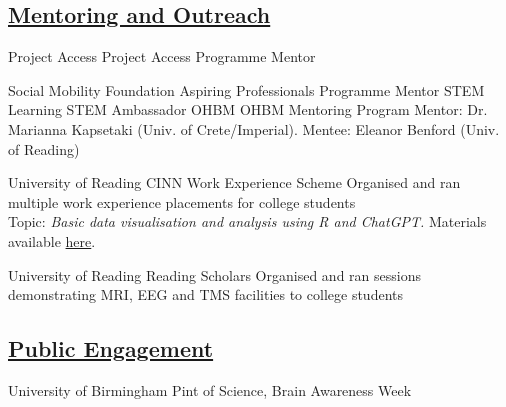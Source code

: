 
\subsection{\underline{Mentoring and Outreach}}

{Project Access}
{Project Access Programme Mentor}

{Social Mobility Foundation}
{Aspiring Professionals Programme Mentor}
{}
{STEM Learning}
{STEM Ambassador}
{}
{OHBM}
{OHBM Mentoring Program}
{Mentor: Dr. Marianna Kapsetaki (Univ. of Crete/Imperial). Mentee: Eleanor Benford (Univ. of Reading)}

{University of Reading}
{CINN Work Experience Scheme}
{Organised and ran multiple work experience placements for college students \\Topic: \emph{Basic data visualisation and analysis using R and ChatGPT.} Materials available \href{https://github.com/sohaamir/haven_work_exp}{here}.}

{University of Reading}
{Reading Scholars}
{Organised and ran sessions demonstrating MRI, EEG and TMS facilities to college students}

\subsection{\underline{Public Engagement}}
{University of Birmingham}
{Pint of Science, Brain Awareness Week}
{}

